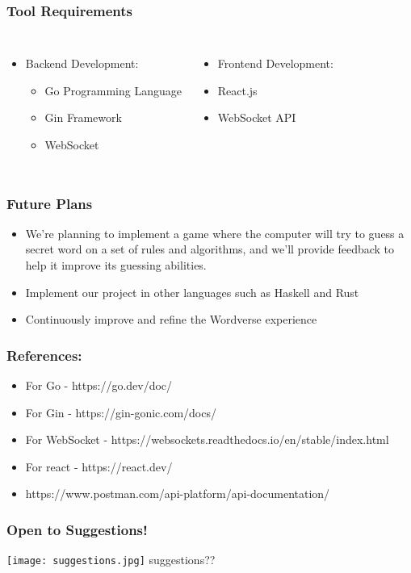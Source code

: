 \documentclass{beamer}
\begin{document}
\begin{frame}
  \frametitle{Tool Requirements}
  \begin{columns}
      \begin{itemize}
        \item Backend Development:
          \begin{itemize}
            \item Go Programming Language
            \item Gin Framework
            \item WebSocket
          \end{itemize}
      \end{itemize}
      \begin{itemize}
        \item Frontend Development:
          \item React.js
            \item WebSocket API
          \end{itemize}
        
      
  \end{columns}
  
\end{frame}
\begin{frame}
  \frametitle{Future Plans}
  \begin{itemize}
    \item We're planning to implement a game where the computer will try to guess a secret word on a set of rules and algorithms, and we'll provide feedback to help it improve its guessing abilities.
    \item Implement our project in other languages such as Haskell and Rust
    \item Continuously improve and refine the Wordverse experience
  \end{itemize}
\end{frame}

\begin{frame}
  \frametitle{References:}
  \begin{itemize}
    \item For Go - https://go.dev/doc/
    \item For Gin - https://gin-gonic.com/docs/
    \item For WebSocket - https://websockets.readthedocs.io/en/stable/index.html
    \item For react - https://react.dev/
    \item https://www.postman.com/api-platform/api-documentation/
  \end{itemize}
\end{frame}

\begin{frame}
  \frametitle{Open to Suggestions!}
  \centering
  \texttt{[image: suggestions.jpg]}
  \vspace{1cm}
  suggestions?? 
  
\end{frame}
\end{document}
